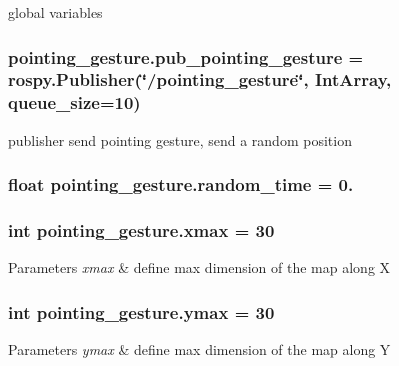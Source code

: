 global variables 

\subsubsection[{\texorpdfstring{pub\+\_\+pointing\+\_\+gesture}{pub_pointing_gesture}}]{\setlength{\rightskip}{0pt plus 5cm}pointing\+\_\+gesture.\+pub\+\_\+pointing\+\_\+gesture = rospy.\+Publisher(\char`\"{}/pointing\+\_\+gesture\char`\"{}, Int\+Array, queue\+\_\+size=10)}\hypertarget{namespacepointing__gesture_a0a5243d3050e55cb47090bcfece22c5d}{}\label{namespacepointing__gesture_a0a5243d3050e55cb47090bcfece22c5d}


publisher send pointing gesture, send a random position 

\subsubsection[{\texorpdfstring{random\+\_\+time}{random_time}}]{\setlength{\rightskip}{0pt plus 5cm}float pointing\+\_\+gesture.\+random\+\_\+time = 0.}\hypertarget{namespacepointing__gesture_a5368d56de06c11e03076a319bb31d276}{}\label{namespacepointing__gesture_a5368d56de06c11e03076a319bb31d276}
\subsubsection[{\texorpdfstring{xmax}{xmax}}]{\setlength{\rightskip}{0pt plus 5cm}int pointing\+\_\+gesture.\+xmax = 30}\hypertarget{namespacepointing__gesture_a5a5b9574617ca751573bb286fd68e3b6}{}\label{namespacepointing__gesture_a5a5b9574617ca751573bb286fd68e3b6}

\begin{DoxyParams}{Parameters}
{\em xmax} & define max dimension of the map along X \\
\hline
\end{DoxyParams}
\subsubsection[{\texorpdfstring{ymax}{ymax}}]{\setlength{\rightskip}{0pt plus 5cm}int pointing\+\_\+gesture.\+ymax = 30}\hypertarget{namespacepointing__gesture_ad11fb91214d8ae42732240b29f4927a0}{}\label{namespacepointing__gesture_ad11fb91214d8ae42732240b29f4927a0}

\begin{DoxyParams}{Parameters}
{\em ymax} & define max dimension of the map along Y \\
\hline
\end{DoxyParams}
